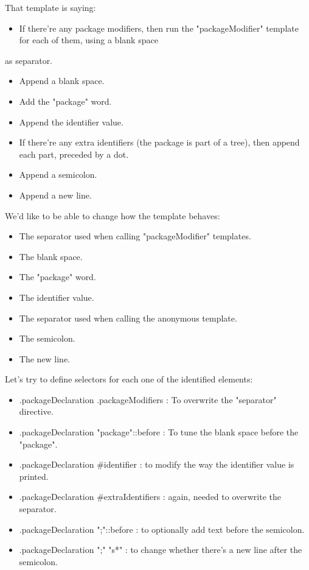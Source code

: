 \documentclass[11pt]{article}
\begin{document}
That template is saying:
\begin{itemize}
\item If there're any package modifiers, then run the "packageModifier" template for each of them, using a blank space
\end{itemize}
as separator.
\begin{itemize}
\item Append a blank space.
\item Add the "package" word.
\item Append the identifier value.
\item If there're any extra identifiers (the package is part of a tree), then append each part, preceded by a dot.
\item Append a semicolon.
\item Append a new line.
\end{itemize}

We'd like to be able to change how the template behaves:
\begin{itemize}
\item The separator used when calling "packageModifier" templates.
\item The blank space.
\item The "package" word.
\item The identifier value.
\item The separator used when calling the anonymous template.
\item The semicolon.
\item The new line.
\end{itemize}

Let's try to define selectors for each one of the identified elements:
\begin{itemize}
\item .packageDeclaration .packageModifiers : To overwrite the "separator" directive.
\item .packageDeclaration "package"::before : To tune the blank space before the "package".
\item .packageDeclaration \#identifier : to modify the way the identifier value is printed.
\item .packageDeclaration \#extraIdentifiers : again, needed to overwrite the separator.
\item .packageDeclaration ";"::before : to optionally add text before the semicolon.
\item .packageDeclaration ";" "s*" : to change whether there's a new line after the semicolon.
\end{itemize}
\end{document}
